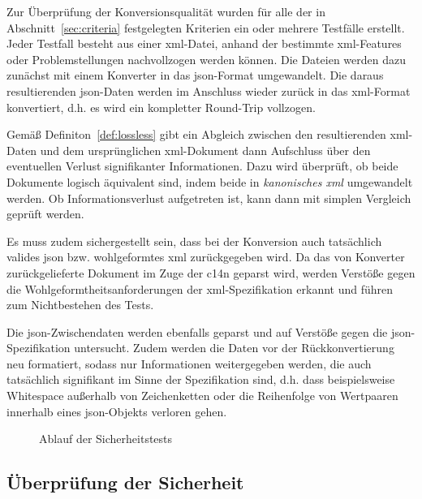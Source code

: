Zur Überprüfung der Konversionsqualität wurden für alle der in Abschnitt~\ref{sec:criteria} festgelegten Kriterien ein oder mehrere Testfälle erstellt. Jeder Testfall besteht aus einer \acrshort{xml}-Datei, anhand der bestimmte \acrshort{xml}-Features oder Problemstellungen nachvollzogen werden können. Die Dateien werden dazu zunächst mit einem Konverter in das \acrshort{json}-Format umgewandelt. Die daraus resultierenden \acrshort{json}-Daten werden im Anschluss wieder zurück in das \acrshort{xml}-Format konvertiert, d.h. es wird ein kompletter Round-Trip vollzogen.

Gemäß Definiton~\ref{def:lossless} gibt ein Abgleich zwischen den resultierenden \acrshort{xml}-Daten und dem ursprünglichen \acrshort{xml}-Dokument dann Aufschluss über den eventuellen Verlust signifikanter Informationen. Dazu wird überprüft, ob beide Dokumente logisch äquivalent sind, indem beide in \emph{kanonisches \acrshort{xml}} umgewandelt werden. Ob Informationsverlust aufgetreten ist, kann dann mit simplen Vergleich geprüft werden.

Es muss zudem sichergestellt sein, dass bei der Konversion auch tatsächlich valides \acrshort{json} bzw. wohlgeformtes \acrshort{xml} zurückgegeben wird. Da das von Konverter zurückgelieferte Dokument im Zuge der \acrlong{c14n} geparst wird, werden Verstöße gegen die Wohlgeformtheitsanforderungen der \acrshort{xml}-Spezifikation erkannt und führen zum Nichtbestehen des Tests.

Die \acrshort{json}-Zwischendaten werden ebenfalls geparst und auf Verstöße gegen die \acrshort{json}-Spezifikation untersucht. Zudem werden die Daten vor der Rückkonvertierung neu formatiert, sodass nur Informationen weitergegeben werden, die auch tatsächlich signifikant im Sinne der Spezifikation sind, d.h. dass beispielsweise Whitespace außerhalb von Zeichenketten oder die Reihenfolge von Wertpaaren innerhalb eines \acrshort{json}-Objekts verloren gehen.

\begin{figure}[b!]
    \begin{center}
        
        \caption{Ablauf der Sicherheitstests}
    \end{center}
\end{figure}

\subsection{Überprüfung der Sicherheit}
\label{sec:method-sec}

